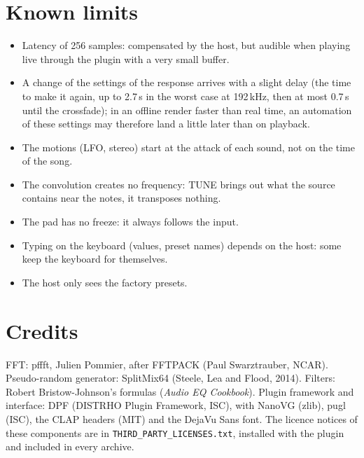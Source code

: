 \documentclass[a4paper,11pt]{article}
\begin{document}
\section{Known limits}\label{sec:limits}
\begin{itemize}
\item Latency of 256 samples: compensated by the host, but audible when playing live through the
  plugin with a very small buffer.
\item A change of the settings of the response arrives with a slight delay (the time to make it
  again, up to 2.7\,s in the worst case at 192\,kHz, then at most 0.7\,s until the crossfade); in an offline render faster than real time, an
  automation of these settings may therefore land a little later than on playback.
\item The motions (LFO, stereo) start at the attack of each sound, not on the time of the
  song.
\item The convolution creates no frequency: TUNE brings out what the source contains near the
  notes, it transposes nothing.
\item The pad has no freeze: it always follows the input.
\item Typing on the keyboard (values, preset names) depends on the host: some keep the keyboard
  for themselves.
\item The host only sees the factory presets.
\end{itemize}

\section{Credits}
FFT: pffft, Julien Pommier, after FFTPACK (Paul Swarztrauber, NCAR). Pseudo-random generator:
SplitMix64 (Steele, Lea and Flood, 2014). Filters: Robert Bristow-Johnson's formulas (\emph{Audio
EQ Cookbook}). Plugin framework and interface: DPF (DISTRHO Plugin Framework, ISC), with NanoVG
(zlib), pugl (ISC), the CLAP headers (MIT) and the DejaVu Sans font. The licence notices of these
components are in \texttt{THIRD\_PARTY\_LICENSES.txt}, installed with the plugin and included in
every archive.
\end{document}
